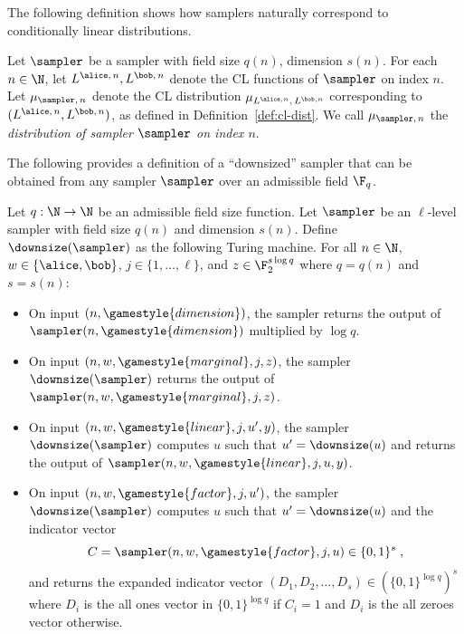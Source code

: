 The following definition shows how samplers naturally correspond to
conditionally linear distributions.
\begin{definition}
  \label{def:sampler-sample}
  Let $\sampler$ be a sampler with field size $q(n)$, dimension $s(n)$.
  For each $n \in \N$, let $L^{\alice,\, n}, L^{\bob,\, n}$ denote the CL
  functions of $\sampler$ on index $n$.
  Let $\mu_{\sampler,\, n}$ denote the CL distribution $\mu_{L^{\alice, n},\,
    L^{\bob, n}}$ corresponding to $(L^{\alice,\, n}, L^{\bob,\, n})$, as
  defined in Definition~\ref{def:cl-dist}.
  We call $\mu_{\sampler,\, n}$ the \emph{distribution of sampler $\sampler$ on
    index $n$}.
\end{definition}

The following provides a definition of a ``downsized'' sampler that can be
obtained from any sampler $\sampler$ over an admissible field $\F_q$.
\begin{definition}
  \label{def:downsize_sampler}
	Let $q: \N \to \N$ be an admissible field size function.
  Let $\sampler$ be an $\ell$-level sampler with field size $q(n)$ and dimension
  $s(n)$.
  Define $\downsize(\sampler)$ as the following Turing machine.
  For all $n \in \N$, $w \in \{\alice,\bob\}$, $j \in \{1,\ldots,\ell\}$, and $z
  \in \F_2^{s \log q}$ where $q = q(n)$ and $s = s(n)$:
	\begin{itemize}
  \item On input $(n, \gamestyle{dimension})$, the sampler returns the output of
    $\sampler(n, \gamestyle{dimension})$ multiplied by $\log q$.
		
	\item On input $(n, w, \gamestyle{marginal}, j, z)$, the sampler
    $\downsize(\sampler)$ returns the output of $\sampler(n, w,
    \gamestyle{marginal}, j, z)$.
		
  \item On input $(n, w, \gamestyle{linear}, j, u', y)$, the sampler
    $\downsize(\sampler)$ computes $u$ such that $u' = \downsize(u)$ and returns
    the output of $\sampler(n, w, \gamestyle{linear}, j, u, y)$.
		
	\item On input $(n, w, \gamestyle{factor}, j, u')$, the sampler
    $\downsize(\sampler)$ computes $u$ such that $u' = \downsize(u)$ and the
    indicator vector
    \[
      C = \sampler(n, w, \gamestyle{factor}, j, u) \in \{0,1\}^s\;,
    \]
    and returns the expanded indicator vector $(D_1, D_2, \ldots, D_s) \in (\{0,
    1\}^{\log q})^s$ where $D_i$ is the all ones vector in $\{0, 1\}^{\log q}$
    if $C_i = 1$ and $D_i$ is the all zeroes vector otherwise.
  \end{itemize}
\end{definition}


